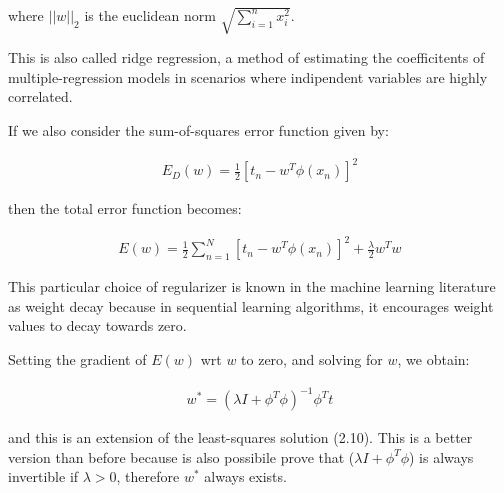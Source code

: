 \noindent where $||w||_2$ is the euclidean norm $\sqrt{ \sum_{i=1}^{n} x^2_i}$.

\noindent This is also called ridge regression, a method of estimating the coefficitents of multiple-regression models in scenarios where indipendent variables are highly correlated.

\noindent If we also consider the sum-of-squares error function given by:
\begin{Equation}[H]
	\centering
		\begin{equation}
			\begin{aligned}
				E_D(w) = \frac{1}{2} [t_n - w^T \phi(x_n)]^2
			\end{aligned}
		\end{equation}
	\label{eq:mathmodelaada}
\end{Equation}

\noindent then the total error function becomes:

\begin{Equation}[H]
	\centering
		\begin{equation}
			\begin{aligned}
				E(w) = \frac{1}{2} \sum_{n=1}^{N}[t_n - w^T \phi(x_n)]^2 + \frac{\lambda}{2} w^T w
			\end{aligned}
		\end{equation}
	\label{eq:mathmodelaada}
\end{Equation}

\noindent This particular choice of regularizer is known in the machine learning literature as
weight decay because in sequential learning algorithms, it encourages weight values
to decay towards zero.

\noindent Setting the gradient of $E(w)$ wrt $w$ to zero, and solving for $w$, we obtain:

\begin{Equation}[H]
	\centering
		\begin{equation}
			\begin{aligned}
				w^* = (\lambda I + \phi^T \phi)^{-1} \phi^T t
			\end{aligned}
		\end{equation}
	\label{eq:mathmodelaada}
\end{Equation}

\noindent and this is an extension of the least-squares solution (2.10). This is a better version than before because is also possibile prove that ($\lambda I + \phi^T \phi$) is always invertible if $\lambda > 0$, therefore $w^*$ always exists.

